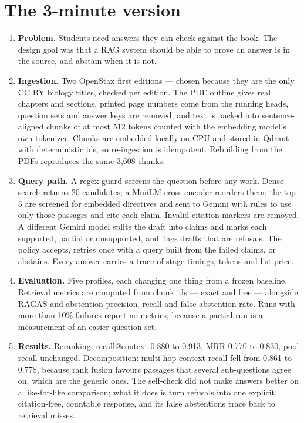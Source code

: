 \section{The 3-minute version}

\begin{enumerate}
  \item \textbf{Problem.} Students need answers they can check against the book. The design goal was that a RAG system should be able to prove an answer is in the source, and abstain when it is not.
  \item \textbf{Ingestion.} Two OpenStax first editions --- chosen because they are the only CC BY biology titles, checked per edition. The PDF outline gives real chapters and sections, printed page numbers come from the running heads, question sets and answer keys are removed, and text is packed into sentence-aligned chunks of at most 512 tokens counted with the embedding model's own tokenizer. Chunks are embedded locally on CPU and stored in Qdrant with deterministic ids, so re-ingestion is idempotent. Rebuilding from the PDFs reproduces the same 3,608 chunks.
  \item \textbf{Query path.} A regex guard screens the question before any work. Dense search returns 20 candidates; a MiniLM cross-encoder reorders them; the top 5 are screened for embedded directives and sent to Gemini with rules to use only those passages and cite each claim. Invalid citation markers are removed. A different Gemini model splits the draft into claims and marks each supported, partial or unsupported, and flags drafts that are refusals. The policy accepts, retries once with a query built from the failed claims, or abstains. Every answer carries a trace of stage timings, tokens and list price.
  \item \textbf{Evaluation.} Five profiles, each changing one thing from a frozen baseline. Retrieval metrics are computed from chunk ids --- exact and free --- alongside RAGAS and abstention precision, recall and false-abstention rate. Runs with more than 10\% failures report no metrics, because a partial run is a measurement of an easier question set.
  \item \textbf{Results.} Reranking: recall@context 0.880 to 0.913, MRR 0.770 to 0.830, pool recall unchanged. Decomposition: multi-hop context recall fell from 0.861 to 0.778, because rank fusion favours passages that several sub-questions agree on, which are the generic ones. The self-check did not make answers better on a like-for-like comparison; what it does is turn refusals into one explicit, citation-free, countable response, and its false abstentions trace back to retrieval misses.

\end{enumerate}
